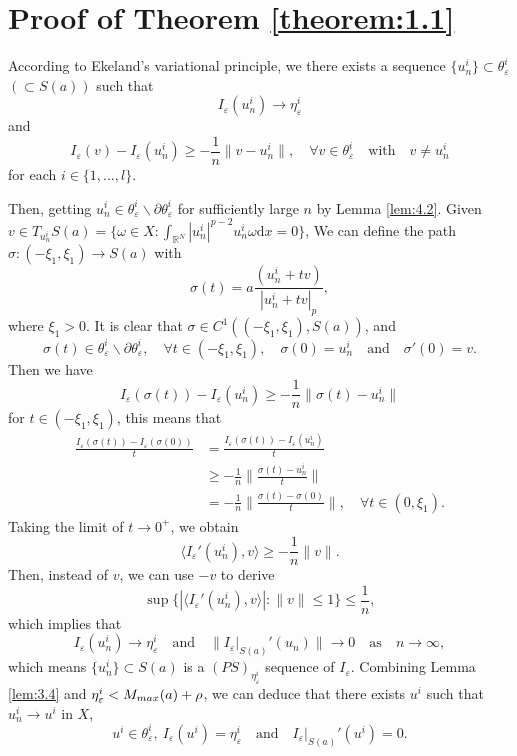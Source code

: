 \documentclass[10pt,a4paper]{amsart}
\numberwithin{equation}{section}
\begin{document}
\section{Proof of Theorem \ref{theorem:1.1}}

According to Ekeland's variational principle, we  there exists a sequence 
$\{u_n^{i}\}\subset \theta_\varepsilon^{i}$ $(\subset S(a))$ such that
$$
I_{\varepsilon}(u_n^{i})\to\eta_\varepsilon^{i}
$$
and
$$
I_\varepsilon(v)-I_{\varepsilon}(u_n^{i})\ge-\frac{1}{n}\|v-u_n^{i}\|,\quad
\forall v\in\theta_\varepsilon^{i}\quad \text{with} \quad v\neq u_n^{i}
$$
for each $i\in\{1,\dots,l\}$.

Then, getting $u_n^{i}\in\theta_\varepsilon^{i}\backslash\partial\theta_\varepsilon^{i}$
 for sufficiently large $n$ by Lemma \ref{lem:4.2}.
Given $v\in T_{u_n^{i}}S(a)=\{\omega\in X:\int_{\mathbb{R}^N}
|u_n^{i}|^{p-2}u_n^{i}\omega \mathrm{d}x=0\}$,
We can define the path $\sigma:(-\xi_1,\xi_1)\to S(a)$
with
$$
\sigma(t)=a\frac{(u_n^{i}+tv)}{|u_n^{i}+tv|_p},
$$
where $\xi_1>0$. It is clear that $\sigma\in C^{1}((-\xi_1,\xi_1),S(a))$,
and
$$
\sigma(t)\in\theta_\varepsilon^{i}\backslash\partial\theta_\varepsilon^{i},\quad 
\forall t\in(-\xi_1,\xi_1),\quad \sigma(0)=u_n^{i}\quad \text{and} \quad \sigma'(0)=v.
$$
Then we have
$$
I_\varepsilon(\sigma(t))-I_\varepsilon(u_n^{i})\ge-\frac{1}{n}\|\sigma(t)-u_n^{i}\|
$$
for $t\in(-\xi_1,\xi_1)$, this means that
\begin{align*}
\frac{I_\varepsilon(\sigma(t))-I_\varepsilon(\sigma(0))}{t}
&=\frac{I_\varepsilon(\sigma(t))-I_\varepsilon(u_n^{i})}{t}\\
&\ge-\frac{1}{n}\|\frac{\sigma(t)-u_n^{i}}{t}\|\\
&=-\frac{1}{n}\|\frac{\sigma(t)-\sigma(0)}{t}\|,\quad\forall t\in(0,\xi_1).
\end{align*}
Taking the limit of $t\to0^{+}$, we obtain
$$
\langle I_{\varepsilon}' (u_n^{i}),v \rangle\ge-\frac{1}{n}\|v\|.
$$
Then, instead of $v$, we can use $-v$ to derive
$$
\sup\{|\langle I_{\varepsilon}' (u_n^{i}),v \rangle|:\|v\|\le1\}\le\frac{1}{n},
$$
which implies that
$$
I_{\varepsilon}(u_n^{i})\to\eta_\varepsilon^{i}\quad \text{and}\quad
\|I_\varepsilon|_{S(a)}'(u_n)\|\to 0\quad \text{as} \quad n\to\infty, 
$$
which means $\{u_n^{i}\}\subset S(a)$ is a $(PS)_{\eta_\varepsilon^{i}}$
sequence of $I_\varepsilon$.
Combining Lemma \ref{lem:3.4} and $\eta_\varepsilon^{i}<M_{\rm max}(a)+\rho$, we can 
deduce that there exists $u^{i}$ such that $u_n^{i}\to u^{i}$ in $X$,
$$
u^{i}\in\theta_\varepsilon^{i},~ I_\varepsilon(u^{i})=\eta_\varepsilon^{i}\quad 
\text{and}\quad I_\varepsilon|_{S(a)}'(u^{i})=0.
$$
\end{document}
